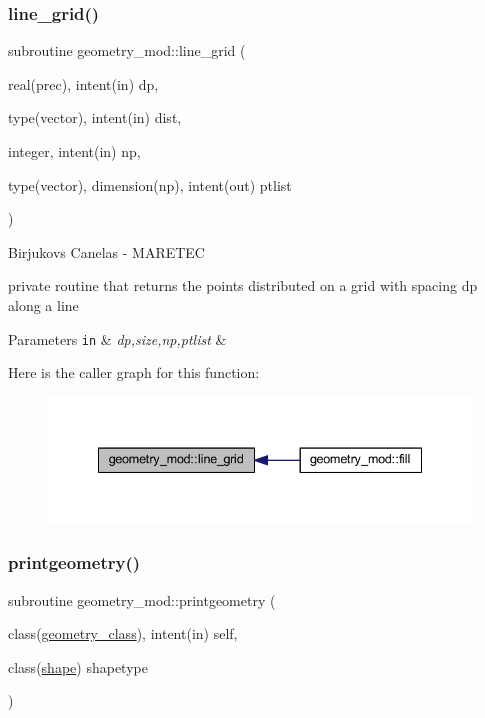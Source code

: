 \subsubsection{\texorpdfstring{line\+\_\+grid()}{line\_grid()}}
{\footnotesize\ttfamily subroutine geometry\+\_\+mod\+::line\+\_\+grid (\begin{DoxyParamCaption}\item[{real(prec), intent(in)}]{dp,  }\item[{type(vector), intent(in)}]{dist,  }\item[{integer, intent(in)}]{np,  }\item[{type(vector), dimension(np), intent(out)}]{ptlist }\end{DoxyParamCaption})\hspace{0.3cm}{\ttfamily [private]}}



Birjukovs Canelas -\/ M\+A\+R\+E\+T\+EC 

private routine that returns the points distributed on a grid with spacing dp along a line 
\begin{DoxyParams}[1]{Parameters}
\mbox{\tt in}  & {\em dp,size,np,ptlist} & \\
\hline
\end{DoxyParams}
Here is the caller graph for this function\+:
\nopagebreak
\begin{figure}[H]
\begin{center}
\leavevmode
\includegraphics[width=335pt]{namespacegeometry__mod_abcb09c0f5274c27cb79b0dd009ed94b3_icgraph}
\end{center}
\end{figure}
\mbox{\label{namespacegeometry__mod_aed4426181ca851b41717edd50268e5f3}} 
\subsubsection{\texorpdfstring{printgeometry()}{printgeometry()}}
{\footnotesize\ttfamily subroutine geometry\+\_\+mod\+::printgeometry (\begin{DoxyParamCaption}\item[{class(\hyperlink{structgeometry__mod_1_1geometry__class}{geometry\+\_\+class}), intent(in)}]{self,  }\item[{class(\hyperlink{structgeometry__mod_1_1shape}{shape})}]{shapetype }\end{DoxyParamCaption})\hspace{0.3cm}{\ttfamily [private]}}



